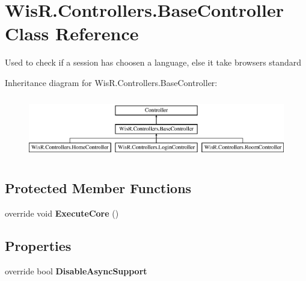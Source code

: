 \hypertarget{class_wis_r_1_1_controllers_1_1_base_controller}{}\section{Wis\+R.\+Controllers.\+Base\+Controller Class Reference}
\label{class_wis_r_1_1_controllers_1_1_base_controller}


Used to check if a session has choosen a language, else it take browsers standard  


Inheritance diagram for Wis\+R.\+Controllers.\+Base\+Controller\+:\begin{figure}[H]
\begin{center}
\leavevmode
\includegraphics[height=2.718446cm]{class_wis_r_1_1_controllers_1_1_base_controller}
\end{center}
\end{figure}
\subsection*{Protected Member Functions}
\begin{DoxyCompactItemize}
\item 
\hypertarget{class_wis_r_1_1_controllers_1_1_base_controller_ac008c39c881b0d44762363f8be73a026}{}override void {\bfseries Execute\+Core} ()\label{class_wis_r_1_1_controllers_1_1_base_controller_ac008c39c881b0d44762363f8be73a026}

\end{DoxyCompactItemize}
\subsection*{Properties}
\begin{DoxyCompactItemize}
\item 
\hypertarget{class_wis_r_1_1_controllers_1_1_base_controller_a85e02c0735d95774747596dedffa5b62}{}override bool {\bfseries Disable\+Async\+Support}\label{class_wis_r_1_1_controllers_1_1_base_controller_a85e02c0735d95774747596dedffa5b62}

\end{DoxyCompactItemize}


